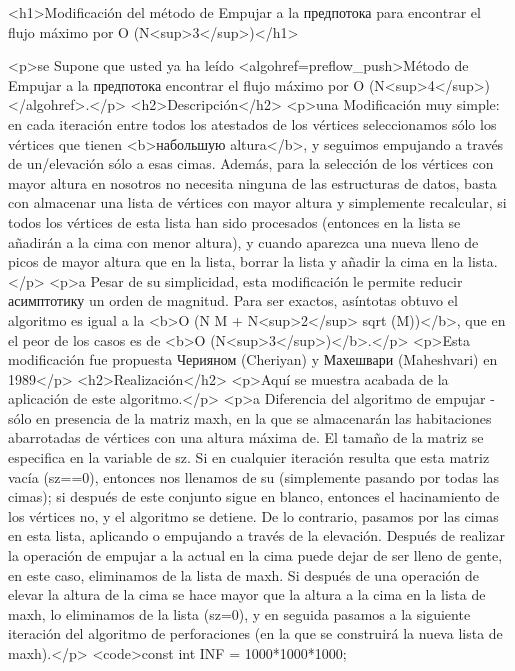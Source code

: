 <h1>Modificación del método de Empujar a la предпотока para encontrar el flujo máximo por O (N<sup>3</sup>)</h1>

<p>se Supone que usted ya ha leído <algohref=preflow_push>Método de Empujar a la предпотока encontrar el flujo máximo por O (N<sup>4</sup>)</algohref>.</p>
<h2>Descripción</h2>
<p>una Modificación muy simple: en cada iteración entre todos los atestados de los vértices seleccionamos sólo los vértices que tienen <b>набольшую altura</b>, y seguimos empujando a través de un/elevación sólo a esas cimas. Además, para la selección de los vértices con mayor altura en nosotros no necesita ninguna de las estructuras de datos, basta con almacenar una lista de vértices con mayor altura y simplemente recalcular, si todos los vértices de esta lista han sido procesados (entonces en la lista se añadirán a la cima con menor altura), y cuando aparezca una nueva lleno de picos de mayor altura que en la lista, borrar la lista y añadir la cima en la lista.</p>
<p>a Pesar de su simplicidad, esta modificación le permite reducir асимптотику un orden de magnitud. Para ser exactos, asíntotas obtuvo el algoritmo es igual a la <b>O (N M + N<sup>2</sup> sqrt (M))</b>, que en el peor de los casos es de <b>O (N<sup>3</sup>)</b>.</p>
<p>Esta modificación fue propuesta Черияном (Cheriyan) y Махешвари (Maheshvari) en 1989</p>
<h2>Realización</h2>
<p>Aquí se muestra acabada de la aplicación de este algoritmo.</p>
<p>a Diferencia del algoritmo de empujar - sólo en presencia de la matriz maxh, en la que se almacenarán las habitaciones abarrotadas de vértices con una altura máxima de. El tamaño de la matriz se especifica en la variable de sz. Si en cualquier iteración resulta que esta matriz vacía (sz==0), entonces nos llenamos de su (simplemente pasando por todas las cimas); si después de este conjunto sigue en blanco, entonces el hacinamiento de los vértices no, y el algoritmo se detiene. De lo contrario, pasamos por las cimas en esta lista, aplicando o empujando a través de la elevación. Después de realizar la operación de empujar a la actual en la cima puede dejar de ser lleno de gente, en este caso, eliminamos de la lista de maxh. Si después de una operación de elevar la altura de la cima se hace mayor que la altura a la cima en la lista de maxh, lo eliminamos de la lista (sz=0), y en seguida pasamos a la siguiente iteración del algoritmo de perforaciones (en la que se construirá la nueva lista de maxh).</p>
<code>const int INF = 1000*1000*1000;

